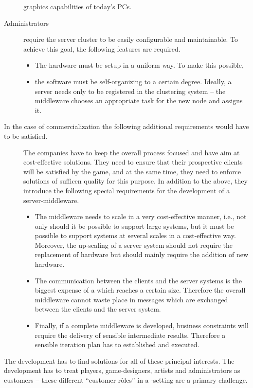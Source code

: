 \documentclass[a4paper, 10pt]{book}
\begin{document}
\begin{description}
        graphics capabilities of today's PCs. 
    \item[Administrators] require the server cluster to be easily
        configurable and maintainable. To achieve this goal, the following
        features are required. 
        \begin{itemize}
            \item The hardware must be setup in a uniform way. To make this
                possible,
            \item the software must be self-organizing to a certain degree.
                Ideally, a server needs only to be registered in the clustering
                system -- the middleware chooses an appropriate task for the new
                node and assigns it.
        \end{itemize}

\end{description}
In the case of commercialization the following additional requirements would
have to be satisfied.
\begin{description}
    \item[] The companies have to keep the overall process focused and have
        aim at cost-effective solutions. They need to ensure that their
        prospective clients will be satisfied by the game, and at the same
        time, they need to enforce solutions of sufficen quality for this
        purpose. In addition to the above, they introduce the following
        special requirements for the development of a \MMORG
        server-middleware. 
        \begin{itemize}
            \item The middleware needs to scale in a very cost-effective manner,
                i.e., not only should it be possible to support large systems, but it
                must be possible to support systems at several scales in a
                cost-effective way. Moreover, the up-scaling of a \MMORG server
                system should not require the replacement of hardware but should
                mainly require the addition of new hardware. 
            \item The communication between the clients and the server systems
                is the biggest expense of a \MMORG which reaches a certain
                size. Therefore the overall middleware cannot waste place in
                messages which are exchanged between the clients and the server
                system.
            \item Finally, if a complete middleware is developed, business
                constraints will require the delivery of sensible intermediate
                results. Therefore a sensible iteration plan has to established
                and executed.
        \end{itemize}
\end{description}
%
The \MMORG development has to find solutions for all of these principal
interests. The development has to treat players, game-designers,
artists and administrators as customers -- these different ``customer
r\^{o}les'' in a \MMORG-setting are a primary challenge.
%
\end{document}
